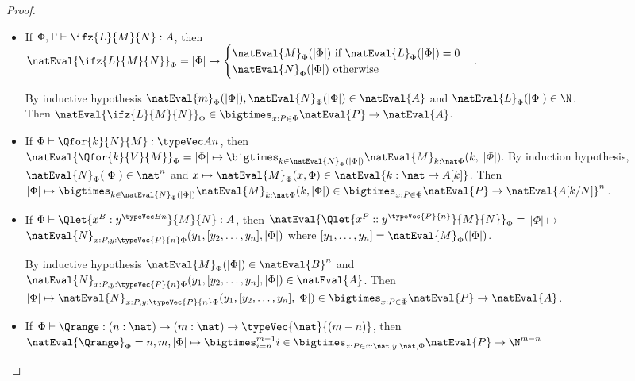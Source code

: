 \begin{proof}
\begin{itemize}
        \item If $\Phi, \Gamma \vdash \ifz{L}{M}{N} : A$, then \\
        $\natEval{\ifz{L}{M}{N}}_\Phi = |\Phi| \mapsto \begin{cases}
            \natEval{M}_\Phi(|\Phi|) \text{ if } \natEval{L}_\Phi(|\Phi|) = 0 \\
            \natEval{N}_\Phi(|\Phi|) \text{ otherwise}
        \end{cases}.$

        By inductive hypothesis $\natEval{m}_\Phi(|\Phi|),\natEval{N}_\Phi(|\Phi|)\in\natEval{A}$ and $\natEval{L}_\Phi(|\Phi|)\in\N$. \\
        Then $\natEval{\ifz{L}{M}{N}}_\Phi\in\bigtimes_{x:P \in \Phi} \natEval{P} \to \natEval{A}$.

        \item If $\Phi\vdash \Qfor{k}{N}{M} : \typeVec A n$, then
        $\natEval{\Qfor{k}{V}{M}}_\Phi = |\Phi| \mapsto \bigtimes_{k\in
        \natEval{N}_\Phi(|\Phi|)} \natEval{M}_{k:\nat\Phi}(k,$ $|\Phi|)$.
        By induction hypothesis, $\natEval{N}_\Phi(|\Phi|)\in \nat^n$ and
        $x\mapsto\natEval{M}_\Phi(x, \Phi)\in \natEval{k:\nat\to A[k]}$. Then $|\Phi|
        \mapsto \bigtimes_{k\in \natEval{N}_\Phi(|\Phi|)} \natEval{M}_{k:\nat\Phi}(k,
        |\Phi|)\in\bigtimes_{x:P \in \Phi} \natEval{P} \to\natEval{A[k/N]}^n$.

        \item If $\Phi\vdash \Qlet{x^B : y^{\typeVec B n}}{M}{N}:A$, then
        $\natEval{\Qlet{x^P :: y^{\typeVec{P}{n}}}{M}{N}}_\Phi =$\allowbreak
        $|\Phi|\mapsto$ \\
        $ \natEval{N}_{x:P, y:\typeVec{P}{n}\Phi}(y_1,[y_2,\dots,y_n],|\Phi|)$
        where $[y_1,\dots,y_n] = \natEval{M}_\Phi(|\Phi|)$.
        
        By inductive hypothesis
        $\natEval{M}_\Phi(|\Phi|)\in \natEval{B}^n$ and $\natEval{N}_{x:P, y:\typeVec{P}{n}
        \Phi}(y_1,[y_2,\dots,y_n],|\Phi|)\in\natEval{A}$. Then $|\Phi|\mapsto
        \natEval{N}_{x:P, y:\typeVec{P}{n}
        \Phi}(y_1,[y_2,\dots,y_n],|\Phi|)\in\bigtimes_{x:P \in \Phi} \natEval{P}
        \to \natEval{A}$.

        \item If $\Phi\vdash \Qrange : (n:\nat)\to (m:\nat)\to \typeVec{\nat}{(m-n)}$, then $\natEval{\Qrange}_\Phi = n,m,|\Phi| \mapsto \bigtimes_{i=n}^{m-1} i\in \bigtimes_{z:P \in x:\nat,y:\nat,\Phi} \natEval{P} \to \N^{m-n}$
    \end{itemize}
\end{proof}

